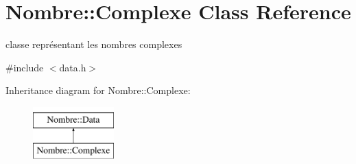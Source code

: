 \hypertarget{classNombre_1_1Complexe}{
\section{Nombre::Complexe Class Reference}
\label{classNombre_1_1Complexe}
}


classe représentant les nombres complexes  




{\ttfamily \#include $<$data.h$>$}

Inheritance diagram for Nombre::Complexe:\begin{figure}[H]
\begin{center}
\leavevmode
\includegraphics[height=2cm]{classNombre_1_1Complexe}
\end{center}
\end{figure}
